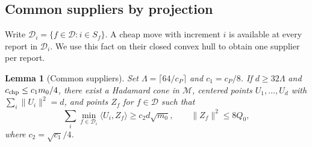 \documentclass[11pt]{article}
\newtheorem{lemma}[theorem]{Lemma}
\theoremstyle{remark}
\newcommand{\cM}{\mathcal M}
\newcommand{\cD}{\mathcal D}
\newcommand{\ip}[2]{\langle #1,#2\rangle}
\newcommand{\norm}[1]{\lVert #1\rVert}
\begin{document}
\subsection{Common suppliers by projection}
Write \(\cD_i=\{f\in\cD:i\in S_f\}\). A cheap move with increment \(i\)
is available at every report in \(\cD_i\). We use this fact on their
closed convex hull to obtain one supplier per report.

\begin{lemma}[Common suppliers]\label{lem:common}
Set \(\Lambda=\lceil64/c_P\rceil\) and \(c_1=c_P/8\).
If \(d\ge32\Lambda\) and \(c_{\rm chp}\le c_1m_0/4\), there exist a
Hadamard cone in \(\cM\), centered points \(U_1,\ldots,U_d\) with
\(\sum_i\norm{U_i}^2=d\), and points \(Z_f\) for \(f\in\cD\) such that
\begin{equation}\label{eq:common}
 \sum_i\min_{f\in\cD_i}\ip{U_i}{Z_f}\ge c_2 d\sqrt{m_0},
 \qquad \norm{Z_f}^2\le8Q_0 ,
\end{equation}
where \(c_2=\sqrt{c_1}/4\).
\end{lemma}
\end{document}
